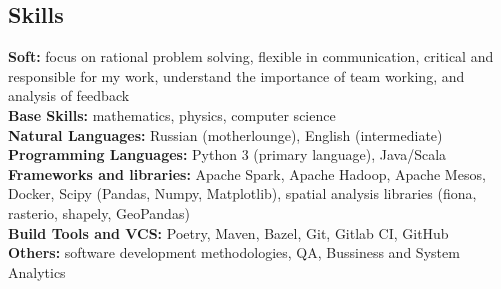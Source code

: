 \subsection*{Skills}
\textbf{Soft:} focus on rational problem solving, flexible in communication, critical and responsible for my work,
understand the importance of team working, and analysis of feedback \\
\textbf{Base Skills:} mathematics, physics, computer science \\
\textbf{Natural Languages:} Russian (motherlounge), English (intermediate) \\
\textbf{Programming Languages:} Python 3 (primary language), Java/Scala\\
\textbf{Frameworks and libraries:} Apache Spark, Apache Hadoop, Apache Mesos, Docker, Scipy (Pandas, Numpy,
Matplotlib), spatial analysis libraries (fiona, rasterio, shapely, GeoPandas) \\
\textbf{Build Tools and VCS:} Poetry, Maven, Bazel, Git, Gitlab CI, GitHub \\
\textbf{Others:} software development methodologies, QA, Bussiness and System Analytics
